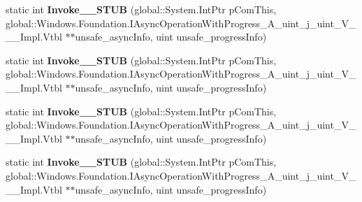 \begin{DoxyCompactItemize}
\item 
\mbox{\label{struct_windows_1_1_foundation_1_1_async_operation_progress_handler___a__uint__j__uint___v_______impl_1_1_vtbl_a0e7f4faddca6cbaa7ea1a6f5cba3c932}} 
static int {\bfseries Invoke\+\_\+\+\_\+\+S\+T\+UB} (global\+::\+System.\+Int\+Ptr p\+Com\+This, global\+::\+Windows.\+Foundation.\+I\+Async\+Operation\+With\+Progress\+\_\+\+A\+\_\+uint\+\_\+j\+\_\+uint\+\_\+\+V\+\_\+\+\_\+\+\_\+\+Impl.\+Vtbl $\ast$$\ast$unsafe\+\_\+async\+Info, uint unsafe\+\_\+progress\+Info)
\item 
\mbox{\label{struct_windows_1_1_foundation_1_1_async_operation_progress_handler___a__uint__j__uint___v_______impl_1_1_vtbl_a0e7f4faddca6cbaa7ea1a6f5cba3c932}} 
static int {\bfseries Invoke\+\_\+\+\_\+\+S\+T\+UB} (global\+::\+System.\+Int\+Ptr p\+Com\+This, global\+::\+Windows.\+Foundation.\+I\+Async\+Operation\+With\+Progress\+\_\+\+A\+\_\+uint\+\_\+j\+\_\+uint\+\_\+\+V\+\_\+\+\_\+\+\_\+\+Impl.\+Vtbl $\ast$$\ast$unsafe\+\_\+async\+Info, uint unsafe\+\_\+progress\+Info)
\item 
\mbox{\label{struct_windows_1_1_foundation_1_1_async_operation_progress_handler___a__uint__j__uint___v_______impl_1_1_vtbl_a0e7f4faddca6cbaa7ea1a6f5cba3c932}} 
static int {\bfseries Invoke\+\_\+\+\_\+\+S\+T\+UB} (global\+::\+System.\+Int\+Ptr p\+Com\+This, global\+::\+Windows.\+Foundation.\+I\+Async\+Operation\+With\+Progress\+\_\+\+A\+\_\+uint\+\_\+j\+\_\+uint\+\_\+\+V\+\_\+\+\_\+\+\_\+\+Impl.\+Vtbl $\ast$$\ast$unsafe\+\_\+async\+Info, uint unsafe\+\_\+progress\+Info)
\item 
\mbox{\label{struct_windows_1_1_foundation_1_1_async_operation_progress_handler___a__uint__j__uint___v_______impl_1_1_vtbl_a0e7f4faddca6cbaa7ea1a6f5cba3c932}} 
static int {\bfseries Invoke\+\_\+\+\_\+\+S\+T\+UB} (global\+::\+System.\+Int\+Ptr p\+Com\+This, global\+::\+Windows.\+Foundation.\+I\+Async\+Operation\+With\+Progress\+\_\+\+A\+\_\+uint\+\_\+j\+\_\+uint\+\_\+\+V\+\_\+\+\_\+\+\_\+\+Impl.\+Vtbl $\ast$$\ast$unsafe\+\_\+async\+Info, uint unsafe\+\_\+progress\+Info)

\end{DoxyCompactItemize}
